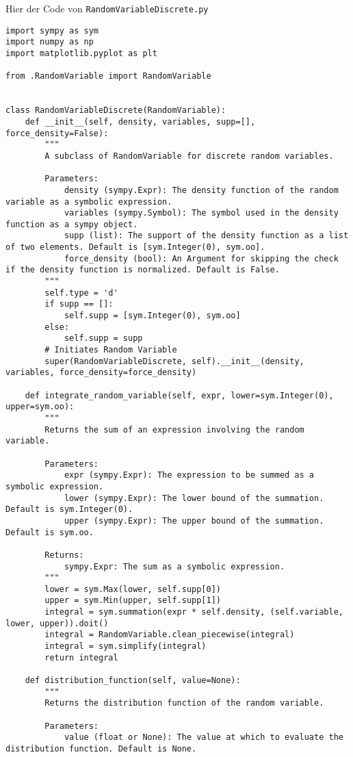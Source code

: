 Hier der Code von \lstinline|RandomVariableDiscrete.py|
\begin{small}
\begin{lstlisting}
import sympy as sym
import numpy as np
import matplotlib.pyplot as plt

from .RandomVariable import RandomVariable


class RandomVariableDiscrete(RandomVariable):
    def __init__(self, density, variables, supp=[], force_density=False):
        """
        A subclass of RandomVariable for discrete random variables.

        Parameters:
            density (sympy.Expr): The density function of the random variable as a symbolic expression.
            variables (sympy.Symbol): The symbol used in the density function as a sympy object.
            supp (list): The support of the density function as a list of two elements. Default is [sym.Integer(0), sym.oo].
            force_density (bool): An Argument for skipping the check if the density function is normalized. Default is False.
        """
        self.type = 'd'
        if supp == []:
            self.supp = [sym.Integer(0), sym.oo]
        else:
            self.supp = supp
        # Initiates Random Variable
        super(RandomVariableDiscrete, self).__init__(density, variables, force_density=force_density)

    def integrate_random_variable(self, expr, lower=sym.Integer(0), upper=sym.oo):
        """
        Returns the sum of an expression involving the random variable.

        Parameters:
            expr (sympy.Expr): The expression to be summed as a symbolic expression.
            lower (sympy.Expr): The lower bound of the summation. Default is sym.Integer(0).
            upper (sympy.Expr): The upper bound of the summation. Default is sym.oo.

        Returns:
            sympy.Expr: The sum as a symbolic expression.
        """
        lower = sym.Max(lower, self.supp[0])
        upper = sym.Min(upper, self.supp[1])
        integral = sym.summation(expr * self.density, (self.variable, lower, upper)).doit()
        integral = RandomVariable.clean_piecewise(integral)
        integral = sym.simplify(integral)
        return integral

    def distribution_function(self, value=None):
        """
        Returns the distribution function of the random variable.

        Parameters:
            value (float or None): The value at which to evaluate the distribution function. Default is None.


\end{lstlisting}
\end{small}
